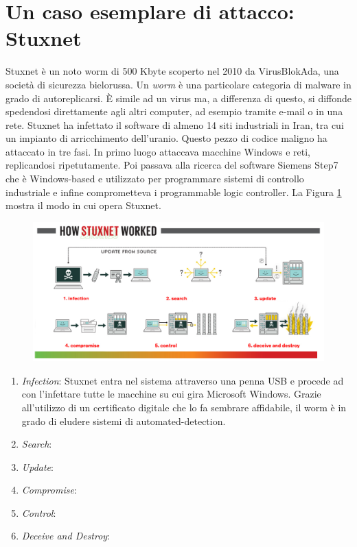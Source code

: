 \section{Un caso esemplare di attacco: Stuxnet}
Stuxnet è un noto worm di 500 Kbyte scoperto nel 2010 da VirusBlokAda, una società di sicurezza bielorussa.
Un \emph{worm} è una particolare categoria di malware in grado di autoreplicarsi. È simile ad un virus ma, a differenza di questo, si diffonde spedendosi direttamente agli altri computer, ad esempio tramite e-mail o in una rete.  Stuxnet ha infettato il software di almeno 14 siti industriali in Iran, tra cui un impianto di arricchimento dell'uranio. Questo pezzo di codice maligno ha attaccato in tre fasi. In primo luogo attaccava macchine Windows e reti, replicandosi ripetutamente. Poi passava alla ricerca del software Siemens Step7 che è Windows-based e utilizzato per programmare sistemi di controllo industriale e infine comprometteva i programmable logic controller. La Figura \ref{fig:stxhsw} mostra il modo in cui opera Stuxnet.
\begin{figure}[h]
	\centering
	\includegraphics[scale=0.350]{imgs/stuxnet_hsw.png}
	\caption{}\label{fig:stxhsw}
\end{figure}

\begin{enumerate}
	\item\emph{Infection}: Stuxnet entra nel sistema attraverso una penna USB e procede ad con l'infettare tutte le macchine su cui gira Microsoft Windows. Grazie all'utilizzo di un certificato digitale che lo fa sembrare affidabile, il worm è in grado di eludere sistemi di automated-detection.
	\item\emph{Search}:
	\item\emph{Update}:
	\item\emph{Compromise}:
	\item\emph{Control}:
	\item\emph{Deceive and Destroy}:
\end{enumerate}


